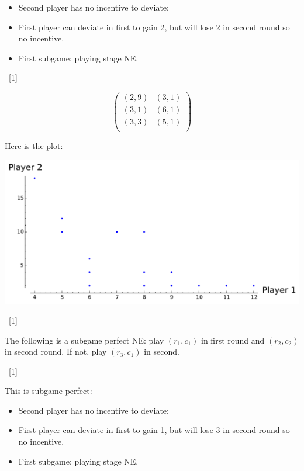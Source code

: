 \documentclass[12pt,a4paper]{article}
\begin{document}
\begin{enumerate}
\begin{enumerate}
            \begin{itemize}
                \item Second player has no incentive to deviate;
                \item First player can deviate in first to gain 2, but will
                    lose 2 in second round so no incentive.
                \item First subgame: playing stage NE.
            \end{itemize}

            ~\hfill[1]

            \[
                \begin{pmatrix}
                    (2,9) & (3,1)\\
                    (3,1) & (6,1)\\
                    (3,3) & (5,1)\\
                \end{pmatrix}
            \]

            Here is the plot:

            \begin{center}
                \includegraphics[width=.6\textwidth]{plots/resit-sol-2013-2014-plt03.pdf}
            \end{center}

            ~\hfill[1]

            The following is a subgame perfect NE: play \((r_1, c_1)\) in first
            round and \((r_2, c_2)\) in second round. If not, play \((r_3, c_1)\) in second.

            ~\hfill[1]

            This is subgame perfect:

            \begin{itemize}
                \item Second player has no incentive to deviate;
                \item First player can deviate in first to gain 1, but will
                    lose 3 in second round so no incentive.
                \item First subgame: playing stage NE.
            \end{itemize}


\end{enumerate}
\end{enumerate}
\end{document}
